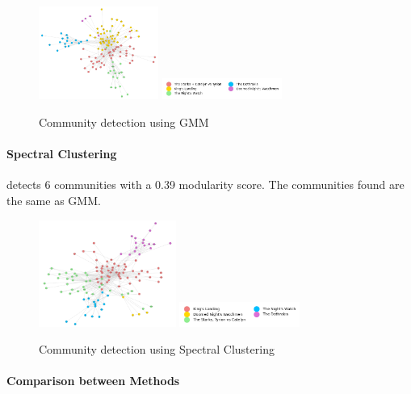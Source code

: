 \documentclass[10pt,twocolumn,letterpaper]{article}
\begin{document}
\begin{figure}[!h]
    \centering
    \includegraphics[width=0.35\textwidth]{img/s1/communities_gmm.jpg}
    \includegraphics[width=0.35\textwidth]{img/s1/gmm_legend.jpg} \\
    \vspace{0.2cm}
    \label{fig:gmm_s1}
    \caption{\small{Community detection using GMM}}
\end{figure}


\paragraph{Spectral Clustering} detects 6 communities with a 0.39 modularity score. The communities found are the same as GMM.

\begin{figure}[!h]
    \centering
    \includegraphics[width=0.4\textwidth]{img/s1/communities_sc.jpg}
    \includegraphics[width=0.35\textwidth]{img/s1/sc_legend.jpg} \\
    \vspace{0.2cm}
    \label{fig:sc_s1}
    \caption{\small{Community detection using Spectral Clustering}}
\end{figure}


\paragraph{Comparison between Methods}
\end{document}
